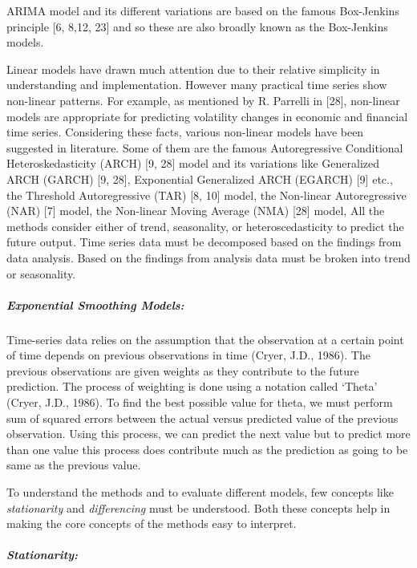 \documentclass[
  letterpaper,
  DIV=11,
  numbers=noendperiod]{scrartcl}
\let\oldsubparagraph\subparagraph
\renewcommand{\subparagraph}[1]{\oldsubparagraph{#1}\mbox{}}
\begin{document}
ARIMA model and its different variations are based on the famous
Box-Jenkins principle {[}6, 8,12, 23{]} and so these are also broadly
known as the Box-Jenkins models.

Linear models have drawn much attention due to their relative simplicity
in understanding and implementation. However many practical time series
show non-linear patterns. For example, as mentioned by R. Parrelli in
{[}28{]}, non-linear models are appropriate for predicting volatility
changes in economic and financial time series. Considering these facts,
various non-linear models have been suggested in literature. Some of
them are the famous Autoregressive Conditional Heteroskedasticity (ARCH)
{[}9, 28{]} model and its variations like Generalized ARCH (GARCH) {[}9,
28{]}, Exponential Generalized ARCH (EGARCH) {[}9{]} etc., the Threshold
Autoregressive (TAR) {[}8, 10{]} model, the Non-linear Autoregressive
(NAR) {[}7{]} model, the Non-linear Moving Average (NMA) {[}28{]} model,
All the methods consider either of trend, seasonality, or
heteroscedasticity to predict the future output. Time series data must
be decomposed based on the findings from data analysis. Based on the
findings from analysis data must be broken into trend or seasonality.

\hypertarget{exponential-smoothing-models}{%
\subparagraph{Exponential Smoothing
Models:}\label{exponential-smoothing-models}}

Time-series data relies on the assumption that the observation at a
certain point of time depends on previous observations in time (Cryer,
J.D., 1986). The previous observations are given weights as they
contribute to the future prediction. The process of weighting is done
using a notation called `Theta' (Cryer, J.D., 1986). To find the best
possible value for theta, we must perform sum of squared errors between
the actual versus predicted value of the previous observation. Using
this process, we can predict the next value but to predict more than one
value this process does contribute much as the prediction as going to be
same as the previous value.

To understand the methods and to evaluate different models, few concepts
like \emph{stationarity} and \emph{differencing} must be understood.
Both these concepts help in making the core concepts of the methods easy
to interpret.

\hypertarget{stationarity}{%
\subparagraph{\texorpdfstring{\textbf{Stationarity:}}{Stationarity:}}\label{stationarity}}
\end{document}
